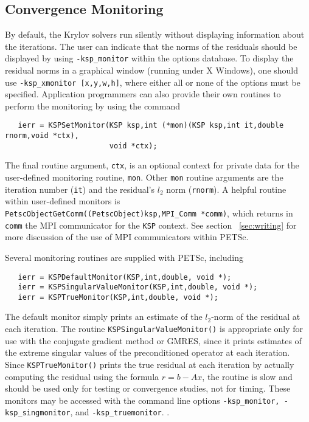\subsection{Convergence Monitoring}
\label{sec:kspmonitor}

By default, the Krylov solvers run silently without displaying information 
about the iterations. The user can indicate that the norms of the residuals 
should be displayed by using 
{\tt -ksp\_monitor} within the options database.  
To display the residual norms in a graphical window (running under X Windows),
one should use {\tt -ksp\_xmonitor [x,y,w,h]}, where either all or none of 
the options must be specified. 
Application programmers can also provide their own routines to perform 
the monitoring by using the command 
\begin{verbatim}
   ierr = KSPSetMonitor(KSP ksp,int (*mon)(KSP ksp,int it,double rnorm,void *ctx),
                        void *ctx);
\end{verbatim}
The final routine argument, {\tt ctx}, is an optional context for private
data for the user-defined monitoring routine, {\tt mon}.  Other
{\tt mon} routine arguments are the iteration
number ({\tt it}) and the residual's $ l_2 $ norm ({\tt rnorm}).
A helpful routine within user-defined monitors is 
{\tt PetscObjectGetComm((PetscObject)ksp,MPI\_Comm *comm)}, which returns
in {\tt comm}   the
MPI communicator for the {\tt KSP} context.  See section ~\ref{sec:writing}
for more discussion of the use of MPI communicators within PETSc.

Several monitoring routines are supplied with PETSc, 
including  
\begin{verbatim}
   ierr = KSPDefaultMonitor(KSP,int,double, void *);
   ierr = KSPSingularValueMonitor(KSP,int,double, void *);
   ierr = KSPTrueMonitor(KSP,int,double, void *);
\end{verbatim}
The default monitor simply prints an estimate of the $l_2$-norm of the 
residual at each iteration. The routine
{\tt KSPSingularValueMonitor()} is appropriate only for use with the conjugate 
gradient method or GMRES, since it prints estimates of the extreme singular 
values of the preconditioned operator at each iteration. Since
{\tt KSPTrueMonitor()} prints 
the true residual at each iteration by 
actually computing the residual using the formula $ r = b - Ax $, the routine
is slow and should be used only for testing or convergence studies,
not for timing. These monitors may be accessed with the command line options
{\tt -ksp\_monitor, -ksp\_singmonitor}, and {\tt -ksp\_truemonitor}.
  .


